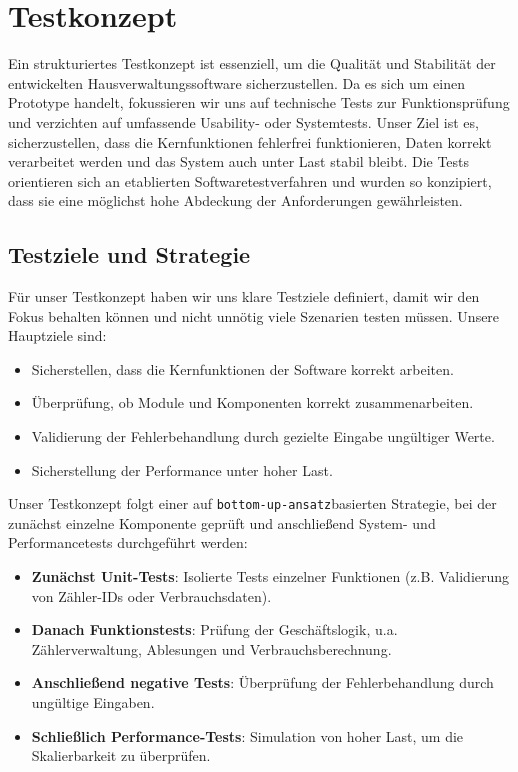 \newpage
\section{Testkonzept}\label{sec:testkonzept}

Ein strukturiertes Testkonzept ist essenziell, um die Qualität und Stabilität der entwickelten Hausverwaltungssoftware sicherzustellen.  
Da es sich um einen Prototype handelt, fokussieren wir uns auf technische Tests zur Funktionsprüfung und verzichten auf umfassende Usability- oder Systemtests.  
Unser Ziel ist es, sicherzustellen, dass die Kernfunktionen fehlerfrei funktionieren, Daten korrekt verarbeitet werden und das System auch unter Last stabil bleibt.
Die Tests orientieren sich an etablierten Softwaretestverfahren und wurden so konzipiert, dass sie eine möglichst hohe Abdeckung der Anforderungen gewährleisten.

\subsection{Testziele und Strategie}\label{subsec:testziele-und-strategie}

Für unser Testkonzept haben wir uns klare Testziele definiert, damit wir den Fokus behalten können und nicht unnötig viele Szenarien testen müssen.
Unsere Hauptziele sind:
\begin{itemize}
	\item Sicherstellen, dass die Kernfunktionen der Software korrekt arbeiten.
	\item Überprüfung, ob Module und Komponenten korrekt zusammenarbeiten.
	\item Validierung der Fehlerbehandlung durch gezielte Eingabe ungültiger Werte.
	\item Sicherstellung der Performance unter hoher Last.
\end{itemize}

Unser Testkonzept folgt einer auf \texttt{bottom-up-ansatz}basierten Strategie, bei der zunächst einzelne Komponente geprüft und anschließend System- und Performancetests durchgeführt werden:
\begin{itemize}
	\item \textbf{Zunächst Unit-Tests}: Isolierte Tests einzelner Funktionen (z.B. Validierung von Zähler-IDs oder Verbrauchsdaten).
	\item \textbf{Danach Funktionstests}: Prüfung der Geschäftslogik, u.a. Zählerverwaltung, Ablesungen und Verbrauchsberechnung.
	\item \textbf{Anschließend negative Tests}: Überprüfung der Fehlerbehandlung durch ungültige Eingaben.
	\item \textbf{Schließlich Performance-Tests}: Simulation von hoher Last, um die Skalierbarkeit zu überprüfen.
\end{itemize}


